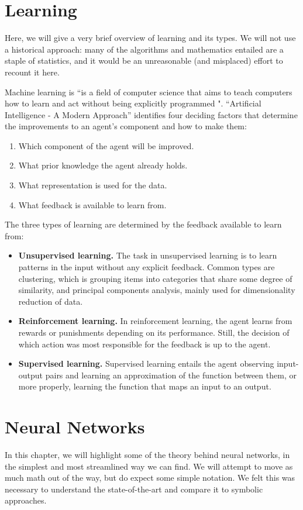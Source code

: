 \documentclass[../main.tex]{subfiles}
\begin{document}
\section{Learning}
Here, we will give a very brief overview of learning and its types. We will not use a historical approach: many of the algorithms and mathematics entailed are a staple of statistics, and it would be an unreasonable (and misplaced) effort to recount it here.

Machine learning is ``is a field of computer science that aims to teach computers how to learn and act without being explicitly programmed \parencite{MachineLearning2019}". ``Artificial Intelligence - A Modern Approach'' identifies four deciding factors that determine the improvements to an agent's component and how to make them:
\begin{enumerate}
    \item Which component of the agent will be improved.
    \item What prior knowledge the agent already holds.
    \item What representation is used for the data.
    \item What feedback is available to learn from.
\end{enumerate}
The three types of learning are determined by the feedback available to learn from:
\begin{itemize}
    \item \textbf{Unsupervised learning.} The task in unsupervised learning is to learn patterns in the input without any explicit feedback. Common types are clustering, which is grouping items into categories that share some degree of similarity, and principal components analysis, mainly used for dimensionality reduction of data.
    \item \textbf{Reinforcement learning.} In reinforcement learning, the agent learns from rewards or punishments depending on its performance. Still, the decision of which action was most responsible for the feedback is up to the agent.
    \item \textbf{Supervised learning.} Supervised learning entails the agent observing input-output pairs and learning an approximation of the function between them, or more properly, learning the function that maps an input to an output.
\end{itemize}

\section{Neural Networks}
In this chapter, we will highlight some of the theory behind neural networks, in the simplest and most streamlined way we can find. We will attempt to move as much math out of the way, but do expect some simple notation. We felt this was necessary to understand the state-of-the-art and compare it to symbolic approaches.
\end{document}
